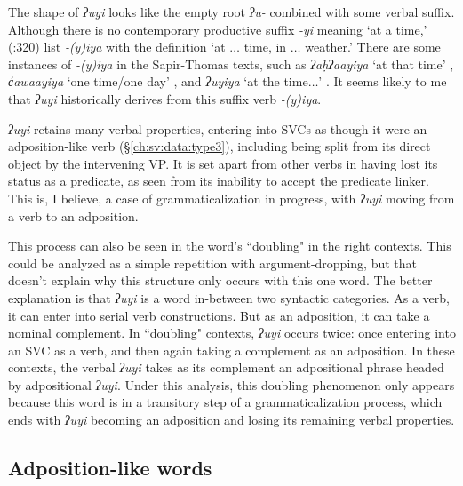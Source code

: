 The shape of \textit{ʔuyi} looks like the empty root \textit{ʔu-} combined with some verbal suffix. Although there is no contemporary productive suffix \textit{-yi} meaning `at a time,' \citeauthor{sapir1939} (\citeyear{sapir1939}:320) list \textit{-(y)iya} with the definition `at $\ldots$ time, in $\ldots$ weather.' There are some instances of \textit{-(y)iya} in the Sapir-Thomas texts, such as \textit{ʔaḥʔaayiya} `at that time' \citep[p.~16]{sapir1939}, \textit{c̓awaayiya} `one time/one day' \citep[p.~19]{sapir1939}, and \textit{ʔuyiya} `at the time$\ldots$' \citep[p.~112]{sapir1939}. %
It seems likely to me that \textit{ʔuyi} historically derives from this suffix verb \textit{-(y)iya}.

\textit{ʔuyi} retains many verbal properties, entering into SVCs as though it were an adposition-like verb (\S\ref{ch:sv:data:type3}), including being split from its direct object by the intervening VP. It is set apart from other verbs in having lost its status as a predicate, as seen from its inability to accept the predicate linker. This is, I believe, a case of grammaticalization in progress, with \textit{ʔuyi} moving from a verb to an adposition.

This process can also be seen in the word's ``doubling" in the right contexts. This could be analyzed as a simple repetition with argument-dropping, but that doesn't explain why this structure only occurs with this one word. The better explanation is that \textit{ʔuyi} is a word in-between two syntactic categories. As a verb, it can enter into serial verb constructions. But as an adposition, it can take a nominal complement. In ``doubling" contexts, \textit{ʔuyi} occurs twice: once entering into an SVC as a verb, and then again taking a complement as an adposition. In these contexts, the verbal \textit{ʔuyi} takes as its complement an adpositional phrase headed by adpositional \textit{ʔuyi}. Under this analysis, this doubling phenomenon only appears because this word is in a transitory step of a grammaticalization process, which ends with \textit{ʔuyi} becoming an adposition and losing its remaining verbal properties.

\subsection{Adposition-like words} \label{ch:link:adpositive}

